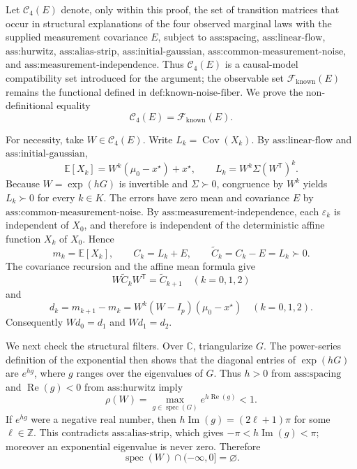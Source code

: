 Let \(\mathcal C_4(E)\) denote, only within this proof, the set of transition matrices that occur in structural explanations of the four observed marginal laws with the supplied measurement covariance \(E\), subject to \(\text{ass:spacing}\), \(\text{ass:linear-flow}\), \(\text{ass:hurwitz}\), \(\text{ass:alias-strip}\), \(\text{ass:initial-gaussian}\), \(\text{ass:common-measurement-noise}\), and \(\text{ass:measurement-independence}\).  Thus \(\mathcal C_4(E)\) is a causal-model compatibility set introduced for the argument; the observable set \(\mathcal F_{\mathrm{known}}(E)\) remains the functional defined in \(\text{def:known-noise-fiber}\).  We prove the non-definitional equality
\[
 \mathcal C_4(E)=\mathcal F_{\mathrm{known}}(E).
\]

For necessity, take \(W\in\mathcal C_4(E)\).  Write \(L_k=\operatorname{Cov}(X_k)\).  By \(\text{ass:linear-flow}\) and \(\text{ass:initial-gaussian}\),
\[
 \mathbb E[X_k]=W^k(\mu_0-x^\star)+x^\star,
 \qquad
 L_k=W^k\Sigma(W^{\mathsf T})^k .
\]
Because \(W=\exp(hG)\) is invertible and \(\Sigma\succ0\), congruence by \(W^k\) yields \(L_k\succ0\) for every \(k\in K\).  The errors have zero mean and covariance \(E\) by \(\text{ass:common-measurement-noise}\).  By \(\text{ass:measurement-independence}\), each \(\varepsilon_k\) is independent of \(X_0\), and therefore is independent of the deterministic affine function \(X_k\) of \(X_0\).  Hence
\[
 m_k=\mathbb E[X_k],
 \qquad
 C_k=L_k+E,
 \qquad
 \widetilde C_k=C_k-E=L_k\succ0.
\]
The covariance recursion and the affine mean formula give
\[
 W\widetilde C_kW^{\mathsf T}=\widetilde C_{k+1}\quad(k=0,1,2)
\]
and
\[
 d_k=m_{k+1}-m_k
     =W^k(W-I_p)(\mu_0-x^\star)\quad(k=0,1,2).
\]
Consequently \(Wd_0=d_1\) and \(Wd_1=d_2\).

We next check the structural filters.  Over \(\mathbb C\), triangularize \(G\).  The power-series definition of the exponential then shows that the diagonal entries of \(\exp(hG)\) are \(e^{hg}\), where \(g\) ranges over the eigenvalues of \(G\).  Thus \(h>0\) from \(\text{ass:spacing}\) and \(\operatorname{Re}(g)<0\) from \(\text{ass:hurwitz}\) imply
\[
 \rho(W)=\max_{g\in\operatorname{spec}(G)}e^{h\operatorname{Re}(g)}<1.
\]
If \(e^{hg}\) were a negative real number, then \(h\operatorname{Im}(g)=(2\ell+1)\pi\) for some \(\ell\in\mathbb Z\).  This contradicts \(\text{ass:alias-strip}\), which gives \(-\pi<h\operatorname{Im}(g)<\pi\); moreover an exponential eigenvalue is never zero.  Therefore
\[
 \operatorname{spec}(W)\cap(-\infty,0]=\varnothing.
\]

